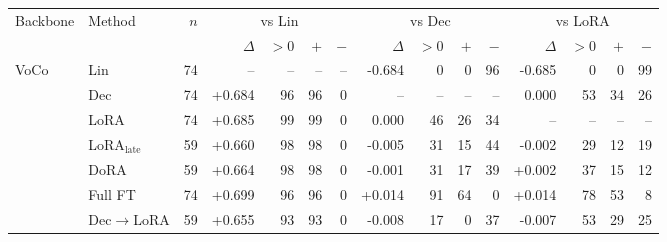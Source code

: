 \setlength{\tabcolsep}{3.5pt}
\begin{tabular}{@{}llrrrrrrrrrrrrr@{}}
\toprule
Backbone & Method & $n$ & \multicolumn{4}{c}{vs Lin} & \multicolumn{4}{c}{vs Dec} & \multicolumn{4}{c}{vs LoRA} \\
\cmidrule(lr){4-7}\cmidrule(lr){8-11}\cmidrule(lr){12-15}
 & & & $\Delta$ & $>0$ & $+$ & $-$ & $\Delta$ & $>0$ & $+$ & $-$ & $\Delta$ & $>0$ & $+$ & $-$ \\
\midrule
VoCo & Lin & 74 & -- & -- & -- & -- & -0.684 & 0 & 0 & 96 & -0.685 & 0 & 0 & 99 \\
 & Dec & 74 & +0.684 & 96 & 96 & 0 & -- & -- & -- & -- & 0.000 & 53 & 34 & 26 \\
 & LoRA & 74 & +0.685 & 99 & 99 & 0 & 0.000 & 46 & 26 & 34 & -- & -- & -- & -- \\
 & LoRA$_{\text{late}}$ & 59 & +0.660 & 98 & 98 & 0 & -0.005 & 31 & 15 & 44 & -0.002 & 29 & 12 & 19 \\
 & DoRA & 59 & +0.664 & 98 & 98 & 0 & -0.001 & 31 & 17 & 39 & +0.002 & 37 & 15 & 12 \\
 & Full FT & 74 & +0.699 & 96 & 96 & 0 & +0.014 & 91 & 64 & 0 & +0.014 & 78 & 53 & 8 \\
 & Dec$\to$LoRA & 59 & +0.655 & 93 & 93 & 0 & -0.008 & 17 & 0 & 37 & -0.007 & 53 & 29 & 25 \\
\bottomrule
\end{tabular}
